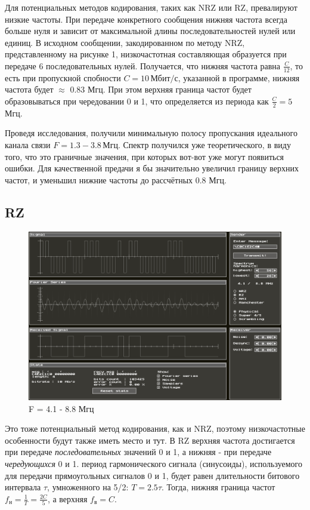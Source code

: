Для потенциальных методов кодирования, таких как NRZ или RZ, превалируют низкие частоты. При передаче конкретного сообщения нижняя частота всегда больше нуля и зависит от максимальной длины последовательностей нулей или единиц. В исходном сообщении, закодированном по методу NRZ, представленному на рисунке 1, низкочастотная составляющая образуется при передаче 6 последовательных нулей. Получается, что нижняя частота равна $\frac{C}{12}$, то есть при пропускной спобности $C = 10 \, \text{Мбит} / \text{с}$, указанной в программе, нижняя частота будет $\approx$ 0.83 Мгц. При этом верхняя граница частот будет образовываться при чередовании 0 и 1, что определяется из периода как $\frac{C}{2} = 5$ Мгц.

Проведя исследования, получили минимальную полосу пропускания идеального канала связи $F = 1.3 - 3.8 \, \text{Мгц}$. Спектр получился уже теоретического, в виду того, что это граничные значения, при которых вот-вот уже могут появиться ошибки. Для качественной предачи я бы значительно увеличил границу верхних частот, и уменьшил нижние частоты до рассчётных 0.8 Мгц.

\subsection{RZ}

\begin{figure}
	\centering
	\includegraphics[width=0.95\linewidth]{./data/ideal_rz_min_f.png}
	\caption{F = 4.1 - 8.8 Мгц}
\end{figure}

Это тоже потенциальный метод кодирования, как и NRZ, поэтому низкочастотные особенности будут также иметь место и тут. В RZ верхняя частота достигается при передаче \textit{последовательных} значений 0 и 1, а нижняя - при передаче \textit{чередующихся} 0 и 1. период гармонического сигнала (синусоиды), используемого для передачи прямоугольных сигналов 0 и 1, будет равен длительности битового интервала $\tau$, умноженного на 5/2: $T = 2.5 \tau$. Тогда, нижняя граница частот $f_{\text{н}} = \frac{1}{T} = \frac{2C}{5}$, а верхняя $f_{\text{в}} = C$.


